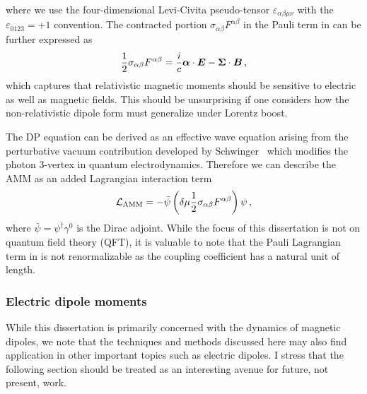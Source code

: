 where we use the four-dimensional Levi-Civita pseudo-tensor $\varepsilon_{\alpha\beta\mu\nu}$ with the $\varepsilon_{0123}=+1$ convention. The contracted portion $\sigma_{\alpha\beta}F^{\alpha\beta}$ in the Pauli term in  can be further expressed as
\begin{alignat}{1}
	\label{dp:2} \frac{1}{2}\sigma_{\alpha\beta}F^{\alpha\beta}=\frac{i}{c}\boldsymbol{\alpha}\cdot\boldsymbol{E}-\boldsymbol{\Sigma}\cdot\boldsymbol{B}\,,
\end{alignat}
which captures that relativistic magnetic moments should be sensitive to electric as well as magnetic fields. This should be unsurprising if one considers how the non-relativistic dipole form must generalize under Lorentz boost.

The DP equation can be derived as an effective wave equation arising from the perturbative vacuum contribution developed by Schwinger~\citep{Itzykson:1980rh,Schwartz:2014sze} which modifies the photon 3-vertex in quantum electrodynamics. Therefore we can describe the AMM as an added Lagrangian interaction term
\begin{gather}
    \label{lamm:1}
    {\cal L}_{\rm AMM} = -{\bar\psi}\left(\delta\mu\frac{1}{2}\sigma_{\alpha\beta}F^{\alpha\beta}\right)\psi\,,
\end{gather}
where ${\bar\psi}=\psi^{\dagger}\gamma^{0}$ is the Dirac adjoint. While the focus of this dissertation is not on quantum field theory (QFT), it is valuable to note that the Pauli Lagrangian term in  is not renormalizable as the coupling coefficient has a natural unit of length.

\subsubsection{Electric dipole moments}
\label{sec:edm}
\noindent While this dissertation is primarily concerned with the dynamics of magnetic dipoles, we note that the techniques and methods discussed here may also find application in other important topics such as electric dipoles. I stress that the following section should be treated as an interesting avenue for future, not present, work.

